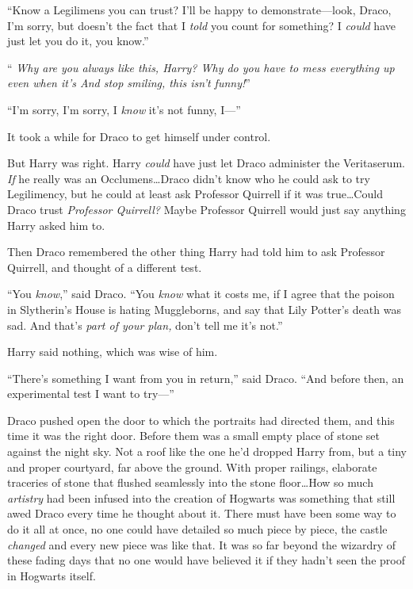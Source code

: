 “Know a Legilimens you can trust? I’ll be happy to demonstrate—look, Draco, I’m sorry, but doesn’t the fact that I \emph{told} you count for something? I \emph{could} have just let you do it, you know.”

“\emph{ Why are you always like this, Harry? Why do you have to mess everything up even when it’s  And stop smiling, this isn’t funny!}”

“I’m sorry, I’m sorry, I \emph{know} it’s not funny, I—”

It took a while for Draco to get himself under control.

But Harry was right. Harry \emph{could} have just let Draco administer the Veritaserum. \emph{If} he really was an Occlumens…Draco didn’t know who he could ask to try Legilimency, but he could at least ask Professor Quirrell if it was true…Could Draco trust \emph{Professor Quirrell?} Maybe Professor Quirrell would just say anything Harry asked him to.

Then Draco remembered the other thing Harry had told him to ask Professor Quirrell, and thought of a different test.

“You \emph{know},” said Draco. “You \emph{know} what it costs me, if I agree that the poison in Slytherin’s House is hating Muggleborns, and say that Lily Potter’s death was sad. And that’s \emph{part of your plan,} don’t tell me it’s not.”

Harry said nothing, which was wise of him.

“There’s something I want from you in return,” said Draco. “And before then, an experimental test I want to try—”

\later

Draco pushed open the door to which the portraits had directed them, and this time it was the right door. Before them was a small empty place of stone set against the night sky. Not a roof like the one he’d dropped Harry from, but a tiny and proper courtyard, far above the ground. With proper railings, elaborate traceries of stone that flushed seamlessly into the stone floor…How so much \emph{artistry} had been infused into the creation of Hogwarts was something that still awed Draco every time he thought about it. There must have been some way to do it all at once, no one could have detailed so much piece by piece, the castle \emph{changed} and every new piece was like that. It was so far beyond the wizardry of these fading days that no one would have believed it if they hadn’t seen the proof in Hogwarts itself.

